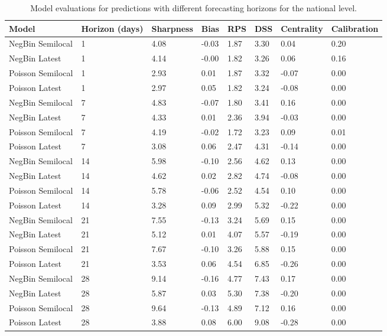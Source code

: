 \begin{table}[ht]
\centering
\begin{tabular}{l|p{2cm}|l|l|l|l|l|l}
 Model & Horizon (days) & Sharpness & Bias & RPS & DSS & Centrality & Calibration \\ 
  \hline
NegBin Semilocal &   1 & 4.08 & -0.03 & 1.87 & 3.30 & 0.04 & 0.20 \\ 
  NegBin Latest &   1 & 4.14 & -0.00 & 1.82 & 3.26 & 0.06 & 0.16 \\ 
  Poisson Semilocal &   1 & 2.93 & 0.01 & 1.87 & 3.32 & -0.07 & 0.00 \\ 
  Poisson Latest &   1 & 2.97 & 0.05 & 1.82 & 3.24 & -0.08 & 0.00 \\ 
   \hline
NegBin Semilocal &   7 & 4.83 & -0.07 & 1.80 & 3.41 & 0.16 & 0.00 \\ 
  NegBin Latest &   7 & 4.33 & 0.01 & 2.36 & 3.94 & -0.03 & 0.00 \\ 
  Poisson Semilocal &   7 & 4.19 & -0.02 & 1.72 & 3.23 & 0.09 & 0.01 \\ 
  Poisson Latest &   7 & 3.08 & 0.06 & 2.47 & 4.31 & -0.14 & 0.00 \\ 
   \hline
NegBin Semilocal &  14 & 5.98 & -0.10 & 2.56 & 4.62 & 0.13 & 0.00 \\ 
  NegBin Latest &  14 & 4.62 & 0.02 & 2.82 & 4.74 & -0.08 & 0.00 \\ 
  Poisson Semilocal &  14 & 5.78 & -0.06 & 2.52 & 4.54 & 0.10 & 0.00 \\ 
  Poisson Latest &  14 & 3.28 & 0.09 & 2.99 & 5.32 & -0.22 & 0.00 \\ 
   \hline
NegBin Semilocal &  21 & 7.55 & -0.13 & 3.24 & 5.69 & 0.15 & 0.00 \\ 
  NegBin Latest &  21 & 5.12 & 0.01 & 4.07 & 5.57 & -0.19 & 0.00 \\ 
  Poisson Semilocal &  21 & 7.67 & -0.10 & 3.26 & 5.88 & 0.15 & 0.00 \\ 
  Poisson Latest &  21 & 3.53 & 0.06 & 4.54 & 6.85 & -0.26 & 0.00 \\ 
   \hline
NegBin Semilocal &  28 & 9.14 & -0.16 & 4.77 & 7.43 & 0.17 & 0.00 \\ 
  NegBin Latest &  28 & 5.87 & 0.03 & 5.30 & 7.38 & -0.20 & 0.00 \\ 
  Poisson Semilocal &  28 & 9.64 & -0.13 & 4.89 & 7.12 & 0.16 & 0.00 \\ 
  Poisson Latest &  28 & 3.88 & 0.08 & 6.00 & 9.08 & -0.28 & 0.00 \\ 
   \hline
\end{tabular}
\caption{Model evaluations for predictions with different forecasting horizons for the national level.} 
\label{tab:nat_evo}
\end{table}
